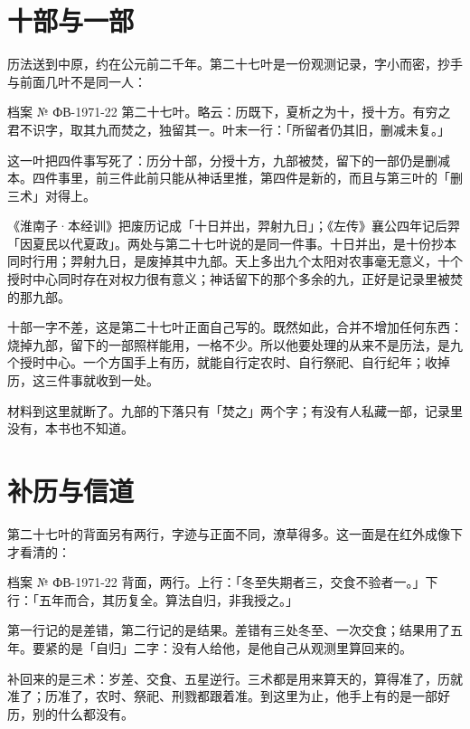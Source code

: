 \section{十部与一部}

历法送到中原，约在公元前二千年。第二十七叶是一份观测记录，字小而密，抄手与前面几叶不是同一人：

\begin{archive}[内部参考]{档案 № ФВ-1971-22}
第二十七叶。略云：历既下，夏析之为十，授十方。有穷之君不识字，取其九而焚之，独留其一。叶末一行：「所留者仍其旧，删减未复。」
\end{archive}

这一叶把四件事写死了：历分十部，分授十方，九部被焚，留下的一部仍是删减本。四件事里，前三件此前只能从神话里推，第四件是新的，而且与第三叶的「删三术」对得上。

《淮南子·本经训》把废历记成「十日并出，羿射九日」；《左传》襄公四年记后羿「因夏民以代夏政」。两处与第二十七叶说的是同一件事。十日并出，是十份抄本同时行用；羿射九日，是废掉其中九部。天上多出九个太阳对农事毫无意义，十个授时中心同时存在对权力很有意义；神话留下的那个多余的九，正好是记录里被焚的那九部。

十部一字不差，这是第二十七叶正面自己写的。既然如此，合并不增加任何东西：烧掉九部，留下的一部照样能用，一格不少。所以他要处理的从来不是历法，是九个授时中心。一个方国手上有历，就能自行定农时、自行祭祀、自行纪年；收掉历，这三件事就收到一处。

材料到这里就断了。九部的下落只有「焚之」两个字；有没有人私藏一部，记录里没有，本书也不知道。

\section{补历与信道}

第二十七叶的背面另有两行，字迹与正面不同，潦草得多。这一面是在红外成像下才看清的：

\begin{archive}[内部参考]{档案 № ФВ-1971-22}
背面，两行。上行：「冬至失期者三，交食不验者一。」下行：「五年而合，其历复全。算法自归，非我授之。」
\end{archive}

第一行记的是差错，第二行记的是结果。差错有三处冬至、一次交食；结果用了五年。要紧的是「自归」二字：没有人给他，是他自己从观测里算回来的。

补回来的是三术：岁差、交食、五星逆行。三术都是用来算天的，算得准了，历就准了；历准了，农时、祭祀、刑戮都跟着准。到这里为止，他手上有的是一部好历，别的什么都没有。

